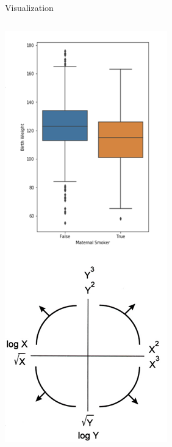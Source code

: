 \documentclass[aspectratio=169]{../latex_main/tntbeamer}  %
\begin{document}
\begin{frame}{Visualization}
\begin{columns}
	       \begin{column}{.4\textwidth}
	          \begin{center}
	              \includegraphics[scale=.33]{Bild4}
	          \end{center}
	       \end{column}
        \end{columns}

	\end{frame}
	
\end{document}
